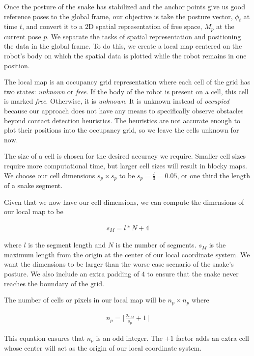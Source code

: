 Once the posture of the snake has stabilized and the anchor points give us good reference poses to the global frame, our objective is take the posture vector, $\bar{\phi_t}$ at time $t$, and convert it to a 2D spatial representation of free space, $M_p$ at the current pose $p$. We separate the tasks of spatial representation and positioning the data in the global frame. To do this, we create a local map centered on the robot's body on which the spatial data is plotted while the robot remains in one position.

The local map is an occupancy grid representation where each cell of the grid has two states: \emph{unknown} or \emph{free}. If the body of the robot is present on a cell, this cell is marked \emph{free}. Otherwise, it is \emph{unknown}. It is unknown instead of \emph{occupied} because our approach does not have any means to specifically observe obstacles beyond contact detection heuristics. The heuristics are not accurate enough to plot their positions into the occupancy grid, so we leave the cells unknown for now.

The size of a cell is chosen for the desired accuracy we require. Smaller cell sizes require more computational time, but larger cell sizes will result in blocky maps. We choose our cell dimensions $s_p \times s_p$ to be $s_p = \frac{l}{3} = 0.05$, or one third the length of a snake segment.

Given that we now have our cell dimensions, we can compute the dimensions of our local map to be 


\begin{eqnarray}
\label{eqn:mapSize}
s_M = l * N + 4
\end{eqnarray}


where $l$ is the segment length and $N$ is the number of segments. $s_M$ is the maximum length from the origin at the center of our local coordinate system. We want the dimensions to be larger than the worse case scenario of the snake's posture. We also include an extra padding of $4$ to ensure that the snake never reaches the boundary of the grid.

The number of cells or pixels in our local map will be $n_p \times n_p$ where 


\begin{eqnarray}
\label{eqn:numPixels}
n_p = \bigg\lceil \frac{2 s_M}{s_p} + 1 \bigg\rceil
\end{eqnarray}


This equation ensures that $n_p$ is an odd integer. The $+1$ factor adds an extra cell whose center will act as the origin of our local coordinate system.


